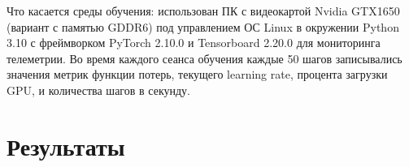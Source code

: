 \documentclass[nonacm, sigconf]{acmart}
\begin{document}
Что касается среды обучения: использован ПК с видеокартой Nvidia GTX1650 (вариант с памятью GDDR6) под управлением ОС Linux в окружении Python 3.10 с фреймворком PyTorch 2.10.0 и Tensorboard 2.20.0 для мониторинга телеметрии. Во время каждого сеанса обучения каждые 50 шагов записывались значения метрик функции потерь, текущего learning rate, процента загрузки GPU, и количества шагов в секунду.

\section{Результаты}



\end{document}
